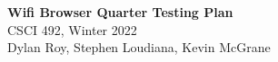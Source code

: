 \documentclass[11pt]{article}
\begin{document}
\begin{center}
  \textbf{\Large Wifi Browser Quarter Testing Plan}\\\large CSCI 492, Winter 2022\\
  Dylan Roy, Stephen Loudiana, Kevin McGrane
\end{center}
\end{document}
